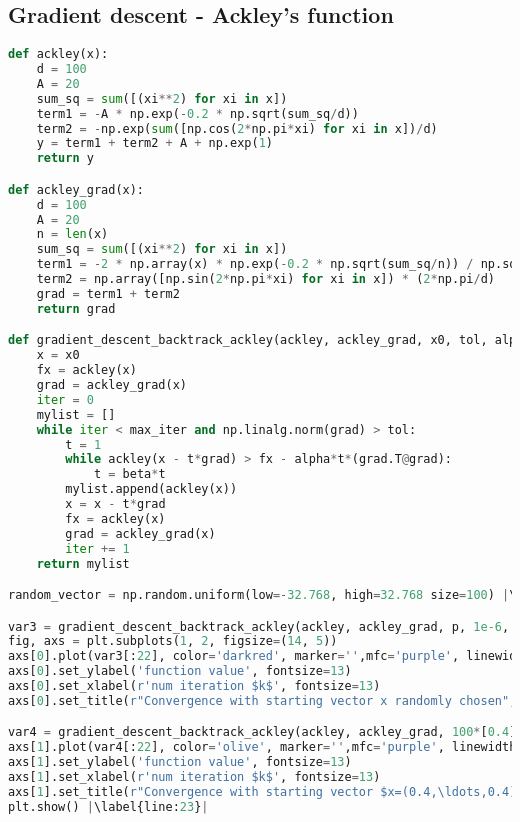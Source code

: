 \subsection{Gradient descent - Ackley's function}\label{GD-Ack}
\begin{lstlisting}[language=Python, label={lst:code7}, mathescape=true, breaklines=true, escapechar=|]
def ackley(x):
    d = 100
    A = 20
    sum_sq = sum([(xi**2) for xi in x])
    term1 = -A * np.exp(-0.2 * np.sqrt(sum_sq/d))
    term2 = -np.exp(sum([np.cos(2*np.pi*xi) for xi in x])/d)
    y = term1 + term2 + A + np.exp(1)
    return y

def ackley_grad(x):
    d = 100
    A = 20
    n = len(x)
    sum_sq = sum([(xi**2) for xi in x])
    term1 = -2 * np.array(x) * np.exp(-0.2 * np.sqrt(sum_sq/n)) / np.sqrt(n*d)
    term2 = np.array([np.sin(2*np.pi*xi) for xi in x]) * (2*np.pi/d)
    grad = term1 + term2
    return grad

def gradient_descent_backtrack_ackley(ackley, ackley_grad, x0, tol, alpha=0.1, beta=0.8, max_iter=1000): 
    x = x0
    fx = ackley(x)
    grad = ackley_grad(x)
    iter = 0
    mylist = []
    while iter < max_iter and np.linalg.norm(grad) > tol:
        t = 1
        while ackley(x - t*grad) > fx - alpha*t*(grad.T@grad):
            t = beta*t
        mylist.append(ackley(x))
        x = x - t*grad
        fx = ackley(x)
        grad = ackley_grad(x)
        iter += 1
    return mylist 

random_vector = np.random.uniform(low=-32.768, high=32.768 size=100) |\label{line:21}|

var3 = gradient_descent_backtrack_ackley(ackley, ackley_grad, p, 1e-6, alpha=0.1, beta=0.8, max_iter=1000) |\label{line:22}|
fig, axs = plt.subplots(1, 2, figsize=(14, 5))
axs[0].plot(var3[:22], color='darkred', marker='',mfc='purple', linewidth=4)
axs[0].set_ylabel('function value', fontsize=13) 
axs[0].set_xlabel(r'num iteration $k$', fontsize=13) 
axs[0].set_title(r"Convergence with starting vector x randomly chosen", fontsize=11.5) 

var4 = gradient_descent_backtrack_ackley(ackley, ackley_grad, 100*[0.4], 1e-06, alpha=0.1, beta=0.8, max_iter=1000)
axs[1].plot(var4[:22], color='olive', marker='',mfc='purple', linewidth=4)
axs[1].set_ylabel('function value', fontsize=13) 
axs[1].set_xlabel(r'num iteration $k$', fontsize=13) 
axs[1].set_title(r"Convergence with starting vector $x=(0.4,\ldots,0.4)$", fontsize=11.5) 
plt.show() |\label{line:23}|
\end{lstlisting}

